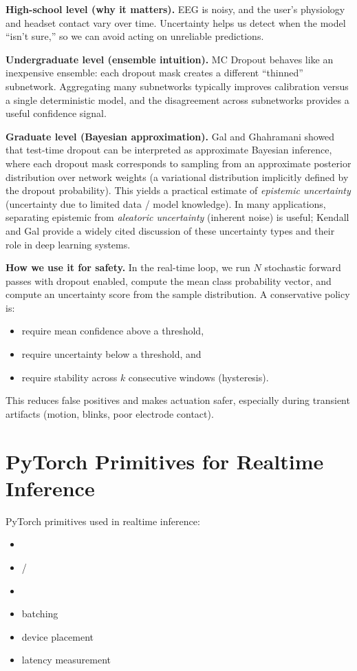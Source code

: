 \documentclass[11pt,openany]{book}
\begin{document}
\textbf{High-school level (why it matters).} EEG is noisy, and the user’s physiology and headset contact vary over time. Uncertainty helps us detect when the model “isn’t sure,” so we can avoid acting on unreliable predictions.

\textbf{Undergraduate level (ensemble intuition).} MC Dropout behaves like an inexpensive ensemble: each dropout mask creates a different “thinned” subnetwork. Aggregating many subnetworks typically improves calibration versus a single deterministic model, and the disagreement across subnetworks provides a useful confidence signal.

\textbf{Graduate level (Bayesian approximation).} Gal and Ghahramani showed that test-time dropout can be interpreted as approximate Bayesian inference, where each dropout mask corresponds to sampling from an approximate posterior distribution over network weights (a variational distribution implicitly defined by the dropout probability). This yields a practical estimate of \emph{epistemic uncertainty} (uncertainty due to limited data / model knowledge). \cite{gal2016dropout} In many applications, separating epistemic from \emph{aleatoric uncertainty} (inherent noise) is useful; Kendall and Gal provide a widely cited discussion of these uncertainty types and their role in deep learning systems. \cite{kendall2017uncertainties}

\textbf{How we use it for safety.} In the real-time loop, we run $N$ stochastic forward passes with dropout enabled, compute the mean class probability vector, and compute an uncertainty score from the sample distribution. A conservative policy is:
\begin{itemize}
\item require mean confidence above a threshold,
\item require uncertainty below a threshold, and
\item require stability across $k$ consecutive windows (hysteresis).
\end{itemize}
This reduces false positives and makes actuation safer, especially during transient artifacts (motion, blinks, poor electrode contact).

\section{PyTorch Primitives for Realtime Inference}
PyTorch primitives used in realtime inference:
\begin{itemize}
\item \texttt{}
\item \texttt{} / \texttt{}
\item \texttt{}
\item batching
\item device placement
\item latency measurement
\end{itemize}
\end{document}
